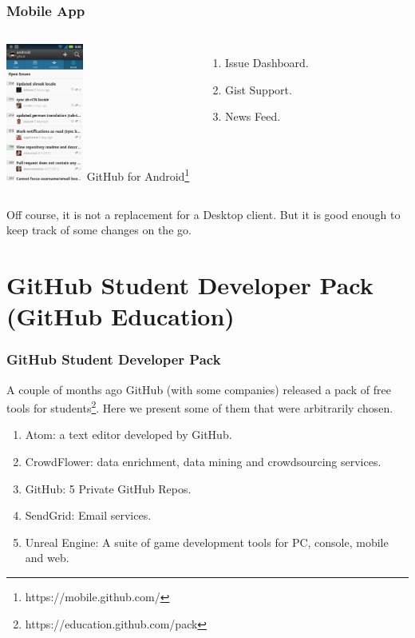\begin{frame}
    \frametitle{Mobile App}
\begin{columns}[c]
\column{2in}
	\centering
	\includegraphics[width=1in]{img/mobile.jpg} 
\column{2in}
GitHub for Android\footnote{https://mobile.github.com/}
\begin{enumerate}
\item Issue Dashboard.
\item Gist Support.
\item News Feed.
\end{enumerate}
\end{columns}
\vspace{5mm}
{\small Off course, it is not a replacement for a Desktop client. But it is good enough to keep track of some changes on the go.}
\end{frame}
\note{}

\section[GitHub Education]{GitHub Student Developer Pack (GitHub Education)}

\begin{frame}
    \frametitle{GitHub Student Developer Pack}
      
    A couple of months ago GitHub (with some companies) released a pack of free tools for students\footnote{https://education.github.com/pack}. Here we present some of them that were arbitrarily chosen.
    
    \begin{enumerate}    
    \item Atom: a text editor developed by GitHub. \pause
    
    \item CrowdFlower: data enrichment, data mining and crowdsourcing services. \pause
    
    \item GitHub: 5 Private GitHub Repos. \pause
    
    \item SendGrid: Email services. \pause
    
    \item Unreal Engine: A suite of game development tools for PC, console, mobile and web.
    \end{enumerate}

\end{frame}
\note{}    

